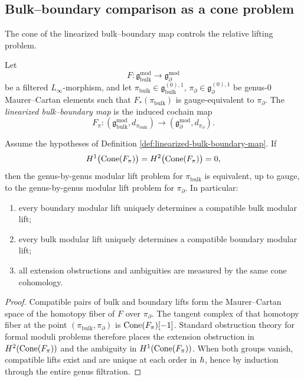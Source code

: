\subsection{Bulk--boundary comparison as a cone problem}
\label{subsec:bulk-boundary-cone-problem}

The cone of the linearized bulk--boundary map controls the relative lifting problem.

\begin{definition}
\label{def:linearized-bulk-boundary-map}
Let
\[
F:\mathfrak g^{\mathrm{mod}}_{\mathrm{bulk}}\longrightarrow \mathfrak g^{\mathrm{mod}}_{\partial}
\]
be a filtered $L_\infty$-morphism, and let
$\pi_{\mathrm{bulk}}\in\mathfrak g_{\mathrm{bulk}}^{(0),1}$,
$\pi_\partial\in\mathfrak g_\partial^{(0),1}$
be genus-$0$ Maurer--Cartan elements such that $F_*(\pi_{\mathrm{bulk}})$ is gauge-equivalent to
$\pi_\partial$. The \emph{linearized bulk--boundary map} is the induced cochain map
\[
F_\pi:(\mathfrak g^{\mathrm{mod}}_{\mathrm{bulk}},d_{\pi_{\mathrm{bulk}}})
\longrightarrow
(\mathfrak g^{\mathrm{mod}}_{\partial},d_{\pi_\partial}).
\]
\end{definition}

\begin{theorem}
\label{thm:relative-bulk-boundary-reconstruction}
Assume the hypotheses of Definition \ref{def:linearized-bulk-boundary-map}. If
\[
H^1\bigl(\operatorname{Cone}(F_\pi)\bigr)=H^2\bigl(\operatorname{Cone}(F_\pi)\bigr)=0,
\]
then the genus-by-genus modular lift problem for $\pi_{\mathrm{bulk}}$ is equivalent, up to gauge,
to the genus-by-genus modular lift problem for $\pi_\partial$. In particular:
\begin{enumerate}[label=\textup{(\roman*)}]
\item every boundary modular lift uniquely determines a compatible bulk modular lift;
\item every bulk modular lift uniquely determines a compatible boundary modular lift;
\item all extension obstructions and ambiguities are measured by the same cone cohomology.
\end{enumerate}
\end{theorem}

\begin{proof}
Compatible pairs of bulk and boundary lifts form the Maurer--Cartan space of the homotopy
fiber of $F$ over $\pi_\partial$. The tangent complex of that homotopy fiber at the point
$(\pi_{\mathrm{bulk}},\pi_\partial)$ is $\operatorname{Cone}(F_\pi)[-1]$. Standard obstruction theory for formal
moduli problems therefore places the extension obstruction in
$H^2(\operatorname{Cone}(F_\pi))$ and the ambiguity in $H^1(\operatorname{Cone}(F_\pi))$. When both groups vanish,
compatible lifts exist and are unique at each order in $\hbar$, hence by induction through the
entire genus filtration.
\end{proof}

